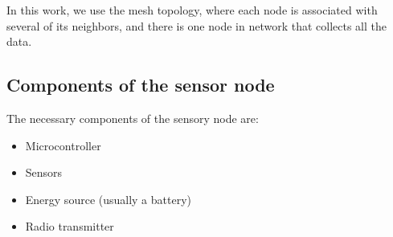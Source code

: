 \documentclass[12pt]{article}
\begin{document}
In this work, we use the mesh topology, where each node is associated with several of its neighbors, and there is one node in network that collects all the data.

\subsection{Components of the sensor node}
The necessary components of the sensory node are:
\begin{itemize}
	\item Microcontroller
	\item Sensors
	\item Energy source (usually a battery)
	\item Radio transmitter
\end{itemize}


\end{document}
